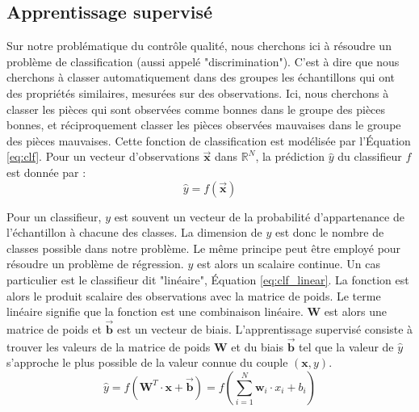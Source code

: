 \subsection{Apprentissage supervisé}
Sur notre problématique du contrôle qualité, nous cherchons ici à résoudre un problème de classification (aussi appelé "discrimination").
C'est à dire que nous cherchons à classer automatiquement dans des groupes les échantillons qui ont des propriétés similaires, mesurées sur des observations.
Ici, nous cherchons à classer les pièces qui sont observées comme bonnes dans le groupe des pièces bonnes, et réciproquement classer les pièces observées mauvaises dans le groupe des pièces mauvaises.
Cette fonction de classification est modélisée par l'Équation \ref{eq:clf}.
Pour un vecteur d'observations $\vec{\mathbf{x}}$ dans $\mathbb {R}^{N}$, la prédiction $\hat{y}$ du classifieur $f$ est donnée par :
\begin{equation} \label{eq:clf}
\hat{y} = f\left(\vec{\mathbf{x}}\right)
\end{equation}

Pour un classifieur, $y$ est souvent un vecteur de la probabilité d'appartenance de l'échantillon à chacune des classes.
La dimension de $y$ est donc le nombre de classes possible dans notre problème.
Le même principe peut être employé pour résoudre un problème de régression.
$y$ est alors un scalaire continue.
Un cas particulier est le classifieur dit "linéaire", Équation \ref{eq:clf_linear}.
La fonction est alors le produit scalaire des observations avec la matrice de poids.
Le terme linéaire signifie que la fonction est une combinaison linéaire.
$\mathbf{W}$ est alors une matrice de poids et $\vec{\mathbf{b}}$ est un vecteur de biais. L'apprentissage supervisé consiste à trouver les valeurs de la matrice de poids $\mathbf{W}$ et du biais $\vec{\mathbf{b}}$ tel que la valeur de $\hat{y}$ s'approche le plus possible de la valeur connue du couple $(\mathbf{x}, y)$.
\begin{equation} \label{eq:clf_linear}
\hat{y} = f\left(\mathbf{W}^{T} \cdot \mathbf{x} + \vec{\mathbf{b}}\right) = f\left(\sum_{i=1}^{N} \mathbf{w}_{i} \cdot x_{i} + b_{i}\right)
\end{equation}

